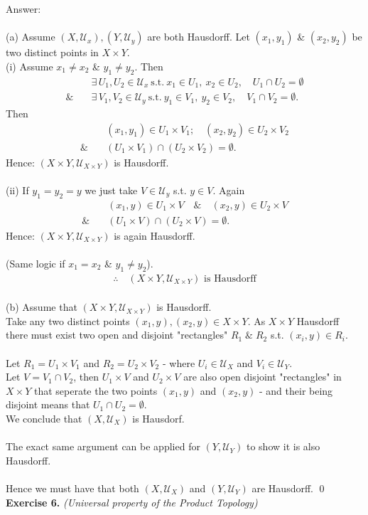 \documentclass[12pt]{article}
\begin{document}
\vspace{1cm}
\noindent
Answer:\\
\\
(a) Assume $(X,\mathcal{U}_x),(Y,\mathcal{U}_y)$ are both Hausdorff.
Let $(x_1,y_1)$ \& $(x_2,y_2)$ be two distinct points in $X\times Y$.\\
(i) Assume $x_1\neq x_2$ \& $y_1\neq y_2$.
Then
\begin{align*}
&\exists\,U_1,U_2\in\mathcal{U}_x\ \text{s.t.}\ x_1\in U_1,\ x_2\in U_2,\quad U_1\cap U_2=\emptyset\\
\text{\&}\quad &\exists\,V_1,V_2\in\mathcal{U}_y\ \text{s.t.}\ y_1\in V_1,\ y_2\in V_2,\quad V_1\cap V_2=\emptyset.
\end{align*}
Then
\begin{align*}
&(x_1,y_1)\in U_1\times V_1;\quad (x_2,y_2)\in U_2\times V_2\\
\text{\&}\quad&(U_1\times V_1)\cap(U_2\times V_2)=\emptyset.
\end{align*}
Hence: $(X\times Y,\mathcal{U}_{X\times Y})$ is Hausdorff.\\
\\
(ii) If $y_1=y_2=y$ we just take $V\in\mathcal{U}_y$ s.t. $y\in V$.
Again
\begin{align*}
&(x_1,y)\in U_1\times V\quad\text{\&}\quad(x_2,y)\in U_2\times V\\
\text{\&}\quad &(U_1\times V)\cap(U_2\times V)=\emptyset.
\end{align*}
Hence: $(X\times Y,\mathcal{U}_{X\times Y})$ is again Hausdorff.\\
\\
(Same logic if $x_1=x_2$ \& $y_1\neq y_2$).
\begin{align*}
\therefore\quad(X\times Y,\mathcal{U}_{X\times Y})\text{ is Hausdorff}
\end{align*}
\\
(b) Assume that $(X\times Y,\mathcal{U}_{X\times Y})$ is Hausdorff.\\
Take any two distinct points $(x_1, y), (x_2, y) \in X\times Y$.  As $X\times Y$ Hausdorff there must exist
two open and disjoint "rectangles" $R_1 \; \& \; R_2$ s.t. $(x_i, y) \in R_i$.\\
\\
Let $R_1 = U_1 \times V_1$ and $R_2 = U_2 \times V_2$ - where $U_i \in \mathcal{U}_{X}$ and  $V_i \in \mathcal{U}_{Y}$.\\
Let $V = V_1 \cap V_2$, then $U_1 \times V$ and $U_2 \times V$ are also open disjoint "rectangles" in $X \times Y$ that seperate the
two points $(x_1, y)$ and $(x_2, y)$ - and their being disjoint means that $U_1 \cap U_2 = \emptyset$.\\
We conclude that $(X, \mathcal{U}_{X})$ is Hausdorf.\\
\\
The exact same argument can be applied for $(Y, \mathcal{U}_{Y})$ to show it is also Hausdorff.\\
\\
Hence we must have that both $(X, \mathcal{U}_{X})$ and $(Y, \mathcal{U}_{Y})$ are Hausdorff.
\qed
\newpage
\noindent\textbf{Exercise 6.} \textit{(Universal property of the Product Topology)}
\end{document}
